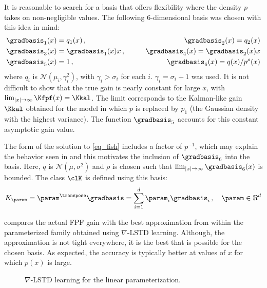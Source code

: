 It is reasonable to search for a basis that offers flexibility where the density $p$ takes on non-negligible values.  The following $6$-dimensional basis was chosen with this idea in mind:
\begin{equation*}
\begin{aligned}
\gradbasis_{1}(x) & = q_1(x)
\, ,\qquad
&\gradbasis_{2}(x)  = q_2(x)
\\
\gradbasis_{3}(x) & = \gradbasis_{1}(x) x \, ,\qquad
&\gradbasis_{4}(x)  = \gradbasis_{2}(x) x \\
\gradbasis_{5}(x) &= 1 \,  ,\qquad &\gradbasis_{6}(x) =q(x)/p^{\rho}(x)
\end{aligned}
\end{equation*}
where $q_i$ is $\mathcal{N}(\mu_i,\gamma_i^2)$, with $\gamma_i>\sigma_i$ for each $i$. $\gamma_i=\sigma_i+1$ was used. It is not difficult to show that the true gain is nearly constant for large $x$, with $\lim_{|x|\to\infty} \Kfpf(x) = \Kkal$. The limit corresponds to the Kalman-like gain $\Kkal$ obtained for the model in which $p$ is replaced by $p_1$  (the Gaussian density with the highest variance). The function $\gradbasis_{5}$ accounts for this constant asymptotic gain value.

The form of the solution to \eqref{eq_fish} includes a factor of $p^{-1}$, which may explain the behavior seen in  and this motivates the inclusion of $\gradbasis_{6}$ into the basis. Here, $q$ is $\mathcal{N}(\mu,\sigma^{2})$ and $\rho$ is chosen such that $\lim_{|x|\to\infty}\gradbasis_{6}(x)$ is bounded. The class $\clK$ is defined using this basis:
\begin{equation*}
K_\param = \param^{\transpose}\gradbasis = \sum_{i=1}^{d}\param_{i}\gradbasis_{i}\,, \quad\param\in\Re^d
\end{equation*}

 compares the actual FPF gain with the best approximation from within the parameterized family obtained using $\nabla$-LSTD learning. Although, the approximation is not tight everywhere, it is the best that is possible for the chosen basis. As expected, the accuracy is typically better at values of $x$ for which $p(x)$ is large.

\begin{figure}[h]
	\caption{$\nabla$-LSTD learning for the linear parameterization.}
	\label{f:lstd}
\end{figure}

